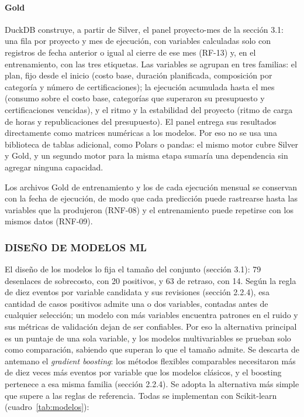 \paragraph{Gold}

DuckDB construye, a partir de Silver, el panel proyecto-mes de la sección 3.1: una fila por proyecto y mes de ejecución, con variables calculadas solo con registros de fecha anterior o igual al cierre de ese mes (RF-13) y, en el entrenamiento, con las tres etiquetas. Las variables se agrupan en tres familias: el plan, fijo desde el inicio (costo base, duración planificada, composición por categoría y número de certificaciones); la ejecución acumulada hasta el mes (consumo sobre el costo base, categorías que superaron su presupuesto y certificaciones vencidas), y el ritmo y la estabilidad del proyecto (ritmo de carga de horas y republicaciones del presupuesto). El panel entrega sus resultados directamente como matrices numéricas a los modelos. Por eso no se usa una biblioteca de tablas adicional, como Polars o pandas: el mismo motor cubre Silver y Gold, y un segundo motor para la misma etapa sumaría una dependencia sin agregar ninguna capacidad.

Los archivos Gold de entrenamiento y los de cada ejecución mensual se conservan con la fecha de ejecución, de modo que cada predicción puede rastrearse hasta las variables que la produjeron (RNF-08) y el entrenamiento puede repetirse con los mismos datos (RNF-09).

\subsubsection{DISEÑO DE MODELOS ML}

El diseño de los modelos lo fija el tamaño del conjunto (sección 3.1): 79 desenlaces de sobrecosto, con 20 positivos, y 63 de retraso, con 14. Según la regla de diez eventos por variable candidata y sus revisiones (sección 2.2.4), esa cantidad de casos positivos admite una o dos variables, contadas antes de cualquier selección; un modelo con más variables encuentra patrones en el ruido y sus métricas de validación dejan de ser confiables. Por eso la alternativa principal es un puntaje de una sola variable, y los modelos multivariables se prueban solo como comparación, sabiendo que superan lo que el tamaño admite. Se descarta de antemano el \textit{gradient boosting}: los métodos flexibles comparables necesitaron más de diez veces más eventos por variable que los modelos clásicos, y el boosting pertenece a esa misma familia (sección 2.2.4). Se adopta la alternativa más simple que supere a las reglas de referencia. Todas se implementan con Scikit-learn (cuadro~\ref{tab:modelos}):

